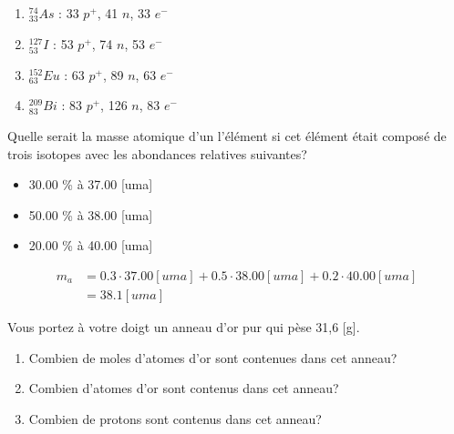 \documentclass[
  11pt,
  french,
  a4paper,
  openany]{book}
\providecommand{\tightlist}{%
  \setlength{\itemsep}{0pt}\setlength{\parskip}{0pt}}
\begin{document}
\begin{Answer}

\begin{enumerate}
\def\labelenumi{\arabic{enumi}.}
\tightlist
\item
  \(^{74}_{33}As\) : 33 \(p^+\), 41 \(n\), 33 \(e^-\)\\
\item
  \(^{127}_{53}I\) : 53 \(p^+\), 74 \(n\), 53 \(e^-\)\\
\item
  \(^{152}_{63}Eu\) : 63 \(p^+\), 89 \(n\), 63 \(e^-\)\\
\item
  \(^{209}_{83}Bi\) : 83 \(p^+\), 126 \(n\), 83 \(e^-\)
\end{enumerate}


\end{Answer}

\begin{Exercise}

Quelle serait la masse atomique d'un l'élément si cet élément était composé de trois isotopes avec les abondances relatives suivantes?

\begin{itemize}
\tightlist
\item
  30.00 \% à 37.00 {[}uma{]}
\item
  50.00 \% à 38.00 {[}uma{]}
\item
  20.00 \% à 40.00 {[}uma{]}
\end{itemize}



\end{Exercise}

\begin{Answer}
\[ \begin{split}
        m_a & = 0.3 \cdot 37.00 [uma] + 0.5 \cdot 38.00 [uma] + 0.2 \cdot 40.00 [uma]\\
        &= 38.1 [uma]
\end{split} \]

\end{Answer}

\begin{Exercise}

Vous portez à votre doigt un anneau d'or pur qui pèse 31,6 {[}g{]}.

\begin{enumerate}
\def\labelenumi{\arabic{enumi}.}
\tightlist
\item
  Combien de moles d'atomes d'or sont contenues dans cet anneau?\\
\item
  Combien d'atomes d'or sont contenus dans cet anneau?\\
\item
  Combien de protons sont contenus dans cet anneau?\\
\end{enumerate}


\end{Exercise}
\end{document}
